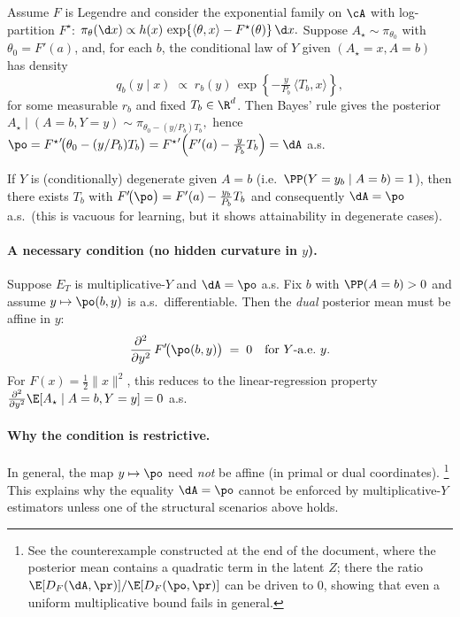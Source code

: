 \begin{corollary}
    \label{cor:mirror-conjugacy}
    Assume $F$ is Legendre and consider the exponential family on $\cA$ with log-partition $F^\star$:
    \(
    \pi_\theta(\d x)\propto h(x)\,\exp\{\langle\theta,x\rangle - F^\star(\theta)\}\,\d x.
    \)
    Suppose $A_\star\sim \pi_{\theta_0}$ with $\theta_0=F'(a)$, and, for each $b$,
    the conditional law of $Y$ given $(A_\star=x,A=b)$ has density
    \[
        q_b(y\mid x) \;\propto\; r_b(y)\,\exp\!\left\{-\tfrac{y}{P_b}\,\langle T_b, x\rangle\right\},
    \]
    for some measurable $r_b$ and fixed $T_b\in\R^d$.
    Then Bayes' rule gives the posterior
    \(
    A_\star\mid (A=b,Y=y)\sim \pi_{\theta_0-(y/P_b)T_b},
    \)
    hence
    \(
    \po={F^\star}'\!\big(\theta_0-(y/P_b)T_b\big)
    ={F^\star}'\!\left(F'(a)-\tfrac{y}{P_b}T_b\right)=\dA
    \)
    a.s.
\end{corollary}

\begin{corollary}[Degenerate $Y$]
    \label{cor:degenerate}
    If $Y$ is (conditionally) degenerate given $A=b$ (i.e.\ $\PP(Y=y_b\mid A=b)=1$), then there exists $T_b$ with
    \(
    F'\!\big(\po\big)=F'(a)-\tfrac{y_b}{P_b}T_b
    \)
    and consequently $\dA=\po$ a.s.\ (this is vacuous for learning, but it shows attainability in degenerate cases).
\end{corollary}

\paragraph{A necessary condition (no hidden curvature in $y$).}
\begin{lemma}
    \label{lem:affine-necessary}
    Suppose $E_T$ is multiplicative-$Y$ and $\dA=\po$ a.s.
    Fix $b$ with $\PP(A=b)>0$ and assume $y\mapsto \po(b,y)$ is a.s.\ differentiable.
    Then the \emph{dual} posterior mean must be affine in $y$:
    \[
        \frac{\partial^2}{\partial y^2}\,F'\!\big(\po(b,y)\big) \;=\; 0
        \quad\text{for $Y$-a.e.\ $y$.}
    \]
    For $F(x)=\tfrac12\|x\|^2$, this reduces to the linear-regression property
    $\frac{\partial^2}{\partial y^2}\E[A_\star\mid A=b,Y=y]=0$ a.s.
\end{lemma}

\paragraph{Why the condition is restrictive.}
In general, the map $y\mapsto \po$ need \emph{not} be affine (in primal or dual coordinates).%
\footnote{See the counterexample constructed at the end of the document, where the posterior mean contains a quadratic term in the latent $Z$; there the ratio $\E[D_F(\dA,\pr)]/\E[D_F(\po,\pr)]$ can be driven to $0$, showing that even a uniform multiplicative bound fails in general.}
This explains why the equality $\dA=\po$ cannot be enforced by multiplicative-$Y$ estimators unless one of the structural scenarios above holds.

